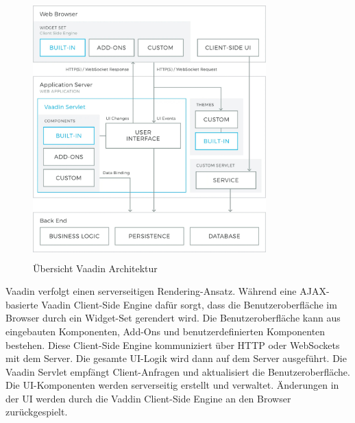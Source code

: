 \documentclass[a4paper,12pt]{scrreprt}
\begin{document}
\begin{figure}[h!]
\centering
\includegraphics[width=9cm, height=10cm]{vaadin_architekture.jpg}
\caption{\label{vaadin:architektur}Übersicht Vaadin Architektur \cite{architecture21}}
\end{figure}
Vaadin verfolgt einen serverseitigen Rendering-Ansatz. Während eine AJAX-basierte Vaadin Client-Side Engine dafür sorgt, dass die Benutzeroberfläche im Browser durch ein Widget-Set gerendert wird. Die Benutzeroberfläche kann aus eingebauten Komponenten, Add-Ons und benutzerdefinierten Komponenten bestehen. Diese Client-Side Engine kommuniziert über HTTP oder WebSockets mit dem Server. Die gesamte UI-Logik wird dann auf dem Server ausgeführt. Die Vaadin Servlet empfängt Client-Anfragen und aktualisiert die Benutzeroberfläche. Die UI-Komponenten werden serverseitig erstellt und verwaltet. Änderungen in der UI werden durch die Vaddin Client-Side Engine an den Browser zurückgespielt.  
\end{document}
